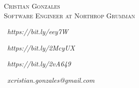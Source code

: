 \documentclass{res}
\begin{document}
\begin{resume}

\begin{center}
\textsc{{\Huge Cristian Gonzales}}\\
\vspace{1mm}
\textsc{\large Software Engineer at Northrop Grumman}\\
\vspace{1mm}
\end{center}

\begin{multicols}{4}
\begin{center}
\faLinkedinSquare\ 
\textit{https://bit.ly/eey7W}
\end{center}
\columnbreak
\begin{center}
\faGithub\ 
\textit{https://bit.ly/2McyUX}
\end{center}
\columnbreak
\begin{center}
\faGlobe\ 
\textit{https://bit.ly/2vA649}
\end{center}
\columnbreak
\faEnvelope\ 
\textit{xcristian.gonzales@gmail.com}
\end{multicols}

\vspace{-3mm}


\end{resume}
\end{document}
